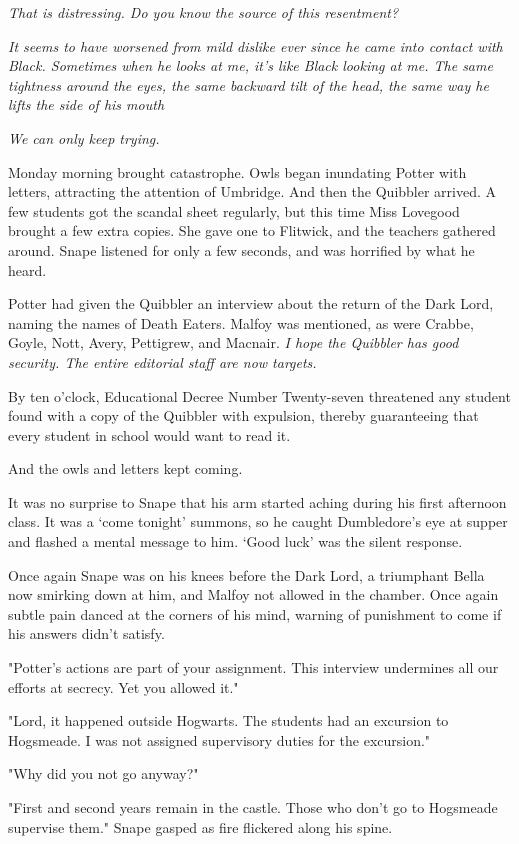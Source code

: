 \emph{That is distressing. Do you know the source of this resentment?}

\emph{It seems to have worsened from mild dislike ever since he came into contact with Black. Sometimes when he looks at me, it's like Black looking at me. The same tightness around the eyes, the same backward tilt of the head, the same way he lifts the side of his mouth{\el}}

\emph{We can only keep trying.}

Monday morning brought catastrophe. Owls began inundating Potter with letters, attracting the attention of Umbridge. And then the Quibbler arrived. A few students got the scandal sheet regularly, but this time Miss Lovegood brought a few extra copies. She gave one to Flitwick, and the teachers gathered around. Snape listened for only a few seconds, and was horrified by what he heard.

Potter had given the Quibbler an interview about the return of the Dark Lord, naming the names of Death Eaters. Malfoy was mentioned, as were Crabbe, Goyle, Nott, Avery, Pettigrew, and Macnair. \emph{I hope the Quibbler has good security. The entire editorial staff are now targets.}

By ten o'clock, Educational Decree Number Twenty-seven threatened any student found with a copy of the Quibbler with expulsion, thereby guaranteeing that every student in school would want to read it.

And the owls and letters kept coming.

It was no surprise to Snape that his arm started aching during his first afternoon class. It was a `come tonight' summons, so he caught Dumbledore's eye at supper and flashed a mental message to him. `Good luck' was the silent response.

Once again Snape was on his knees before the Dark Lord, a triumphant Bella now smirking down at him, and Malfoy not allowed in the chamber. Once again subtle pain danced at the corners of his mind, warning of punishment to come if his answers didn't satisfy.

"Potter's actions are part of your assignment. This interview undermines all our efforts at secrecy. Yet you allowed it."

"Lord, it happened outside Hogwarts. The students had an excursion to Hogsmeade. I was not assigned supervisory duties for the excursion."

"Why did you not go anyway?"

"First and second years remain in the castle. Those who don't go to Hogsmeade supervise them." Snape gasped as fire flickered along his spine.

